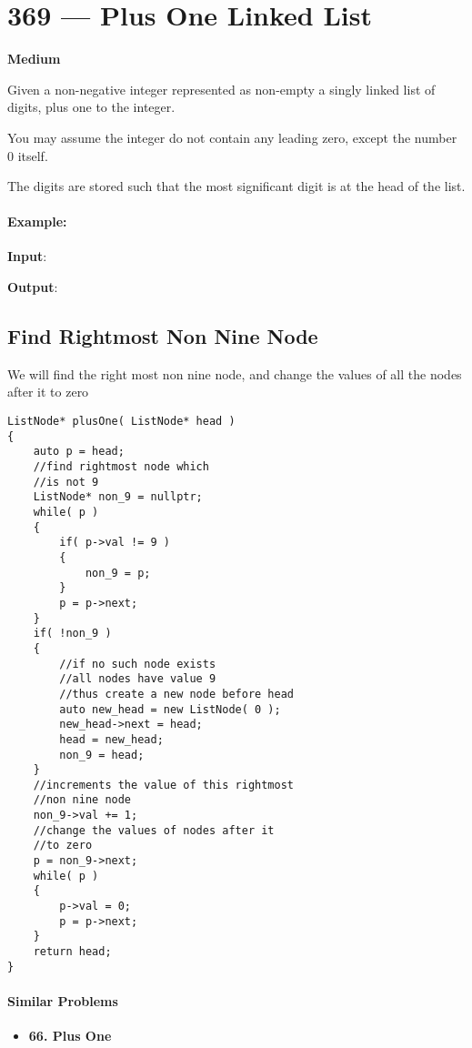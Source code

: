 \section{369 --- Plus One Linked List}

\textbf{Medium}

Given a non-negative integer represented as non-empty a singly linked list of digits, plus one to the integer.

You may assume the integer do not contain any leading zero, except the number 0 itself.

The digits are stored such that the most significant digit is at the head of the list.

\paragraph{Example:}

\begin{flushleft}
\textbf{Input}: \fcj{[1,2,3]}

\textbf{Output}: \fcj{[1,2,4]}
\end{flushleft}

\subsection{Find Rightmost Non Nine Node}
We will find the right most non nine node, and change the values of all the nodes after it to zero

\setcounter{lstlisting}{0}
\begin{lstlisting}[style=customc, caption={Sentinel Node}]
ListNode* plusOne( ListNode* head )
{
    auto p = head;
    //find rightmost node which
    //is not 9
    ListNode* non_9 = nullptr;
    while( p )
    {
        if( p->val != 9 )
        {
            non_9 = p;
        }
        p = p->next;
    }
    if( !non_9 )
    {
        //if no such node exists
        //all nodes have value 9
        //thus create a new node before head
        auto new_head = new ListNode( 0 );
        new_head->next = head;
        head = new_head;
        non_9 = head;
    }
    //increments the value of this rightmost
    //non nine node
    non_9->val += 1;
    //change the values of nodes after it
    //to zero
    p = non_9->next;
    while( p )
    {
        p->val = 0;
        p = p->next;
    }
    return head;
}
\end{lstlisting}

\paragraph{Similar Problems}
\begin{itemize}
\item \textbf{66. Plus One}
\end{itemize}

